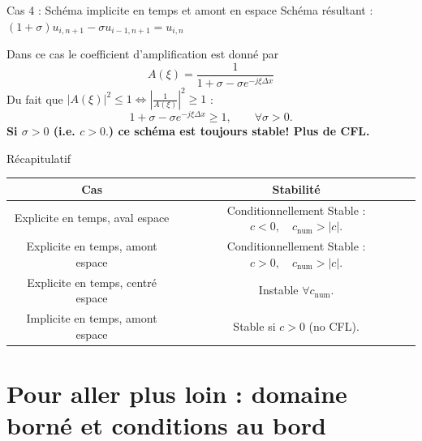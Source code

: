 \documentclass[aspectratio=169, french]{beamer}
\begin{document}
\begin{frame}{Cas 4 : Schéma implicite en temps et amont en espace}
	Schéma résultant : 
	$(1+\sigma)u_{i, n+1} - \sigma u_{i-1, n+1} = u_{i, n} $ 
	
	\begin{tcolorbox}
		Dans ce cas le coefficient d'amplification est donné par
		\begin{equation*}
			A(\xi) = \frac{1}{1 + \sigma - \sigma e^{-j\xi \Delta x}}
		\end{equation*}
Du fait que $|A(\xi)|^2\le1 \iff |\frac{1}{A(\xi)}|^2\ge1$ :
\begin{equation*}
	1 + \sigma- \sigma e^{-j\xi \Delta x} \ge 1, \qquad \forall \sigma >0. 
\end{equation*}
\textbf{Si $\sigma>0$ (i.e. $c>0.$) ce schéma est toujours stable! Plus de CFL. }
		
	\end{tcolorbox}
	
\end{frame}

\begin{frame}{Récapitulatif}
\begin{tabular}{c|c}
	\hline
Cas	&  Stabilité \\
	\hline
Explicite en temps, aval espace	& Conditionnellement Stable : $c<0, \quad c_{\text{num}} > |c|$.   \\
Explicite en temps, amont espace	& Conditionnellement Stable : $c>0, \quad c_{\text{num}} > |c|$.  \\
Explicite en temps, centré espace	&  Instable $\forall c_{\text{num}}$. \\
Implicite en temps, amont espace	& Stable si $c>0$ (no CFL). \\
	\hline
\end{tabular}
\end{frame}

\section{Pour aller plus loin : domaine borné et conditions au bord}
\end{document}
